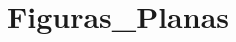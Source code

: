 \hypertarget{group__Figuras__Planas}{}\section{Figuras\+\_\+\+Planas}
\label{group__Figuras__Planas}
